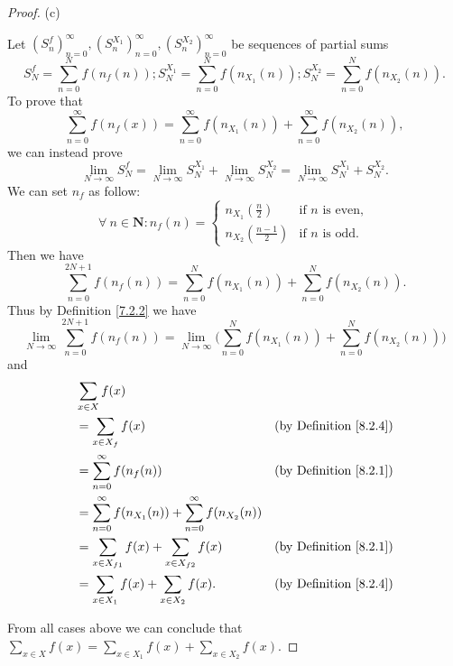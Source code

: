 \begin{proof}{(c)}
\begin{enumerate}[label=(\Roman*)]
\begin{enumerate}[label=(\roman*)]
\[                  \]
                  Let \((S_n^f)_{n = 0}^\infty, (S_n^{X_1})_{n = 0}^\infty, (S_n^{X_2})_{n = 0}^\infty\) be sequences of partial sums
                  \[
                      S_N^f = \sum_{n = 0}^N f(n_f(n)) ; S_N^{X_1} = \sum_{n = 0}^N f(n_{X_1}(n)) ; S_N^{X_2} = \sum_{n = 0}^N f(n_{X_2}(n)).
                  \]
                  To prove that
                  \[
                      \sum_{n = 0}^\infty f(n_f(x)) = \sum_{n = 0}^\infty f(n_{X_1}(n)) + \sum_{n = 0}^\infty f(n_{X_2}(n)),
                  \]
                  we can instead prove
                  \[
                      \lim_{N \to \infty} S_N^f = \lim_{N \to \infty} S_N^{X_1} + \lim_{N \to \infty} S_N^{X_2} = \lim_{N \to \infty} S_N^{X_1} + S_N^{X_2}.
                  \]
                  We can set \(n_f\) as follow:
                  \[
                      \forall\ n \in \mathbf{N} : n_f(n) = \begin{cases}
                          n_{X_1}(\frac{n}{2}) & \text{if } n \text{ is even}, \\
                          n_{X_2}(\frac{n - 1}{2}) & \text{if } n \text{ is odd}.
                      \end{cases}
                  \]
                  Then we have
                  \[
                      \sum_{n = 0}^{2N + 1} f(n_f(n)) = \sum_{n = 0}^N f(n_{X_1}(n)) + \sum_{n = 0}^N f(n_{X_2}(n)).
                  \]
                  Thus by Definition \ref{7.2.2} we have
                  \[
                      \lim_{N \to \infty} \sum_{n = 0}^{2N + 1} f(n_f(n)) = \lim_{N \to \infty} \Bigg(\sum_{n = 0}^N f(n_{X_1}(n)) + \sum_{n = 0}^N f(n_{X_2}(n))\Bigg)
                  \]
                  and
                  \begin{align*}
                      & \sum_{x \in X} f(x) \\
                      & = \sum_{x \in X_f} f(x) & \text{(by Definition \ref{8.2.4})} \\
                      & = \sum_{n = 0}^\infty f(n_f(n)) & \text{(by Definition \ref{8.2.1})} \\
                      & = \sum_{n = 0}^\infty f(n_{X_1}(n)) + \sum_{n = 0}^\infty f(n_{X_2}(n)) \\
                      & = \sum_{x \in X_{f1}} f(x) + \sum_{x \in X_{f2}} f(x) & \text{(by Definition \ref{8.2.1})} \\
                      & = \sum_{x \in X_1} f(x) + \sum_{x \in X_2} f(x). & \text{(by Definition \ref{8.2.4})}
                  \end{align*}
              \end{enumerate}
    \end{enumerate}
    From all cases above we can conclude that \(\sum_{x \in X} f(x) = \sum_{x \in X_1} f(x) + \sum_{x \in X_2} f(x)\).


\end{proof}
